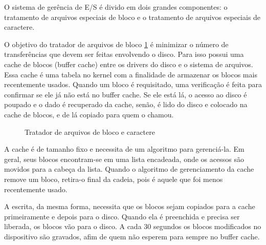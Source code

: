 O sistema de gerência de E/S é divido em dois grandes componentes: o tratamento de arquivos especiais de bloco e o tratamento de arquivos especiais de caractere.

O objetivo do tratador de arquivos de bloco \ref{fig:tratadores} é minimizar o número de transferências que devem ser feitas envolvendo o disco. Para isso possui uma cache de blocos (buffer cache) entre os drivers do disco e o sistema de arquivos. Essa cache é uma tabela no kernel com a finalidade de armazenar os blocos mais recentemente usados. Quando um bloco é requisitado, uma verificação é feita para confirmar se ele já não está no buffer cache. Se ele está lá, o acesso ao disco é poupado e o dado é recuperado da cache, senão, é lido do disco e colocado na cache de blocos, e de lá copiado para quem o chamou.

\begin{figure}
	\caption{Tratador de arquivos de bloco e caractere}
	\label{fig:tratadores}
	\centerline{
	}
\end{figure}

A cache é de tamanho fixo e necessita de um algoritmo para gerenciá-la. Em geral, seus blocos encontram-se em uma lista encadeada, onde os acessos são movidos para a cabeça da lista. Quando o algoritmo de gerenciamento da cache remove um bloco, retira-o final da cadeia, pois é aquele que foi menos recentemente usado.

A escrita, da mesma forma, necessita que os blocos sejam copiados para a cache primeiramente e depois para o disco. Quando ela é preenchida e precisa ser liberada, os blocos vão para o disco. A cada 30 segundos os blocos modificados no dispositivo são gravados, afim de quem não esperem para sempre no buffer cache.

